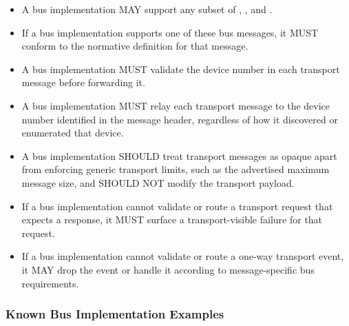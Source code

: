 \begin{itemize}
  \item A bus implementation MAY support any subset of ,
        , and .
  \item If a bus implementation supports one of these bus messages, it MUST
        conform to the normative definition for that message.
\end{itemize}

\begin{itemize}
  \item A bus implementation MUST validate the device number in each transport
        message before forwarding it.
  \item A bus implementation MUST relay each transport message to the device
        number identified in the message header, regardless of how it
        discovered or enumerated that device.
  \item A bus implementation SHOULD treat transport messages as opaque apart
        from enforcing generic transport limits, such as the advertised maximum
        message size, and SHOULD NOT modify the transport payload.
  \item If a bus implementation cannot validate or route a transport request
        that expects a response, it MUST surface a transport-visible failure
        for that request.
  \item If a bus implementation cannot validate or route a one-way transport
        event, it MAY drop the event or handle it according to
        message-specific bus requirements.
\end{itemize}

\subsubsection{Known Bus Implementation Examples}
\label{sec:Virtio Transport Options / Virtio Over Messages / Basic Concepts / Known Bus Implementation Examples}


